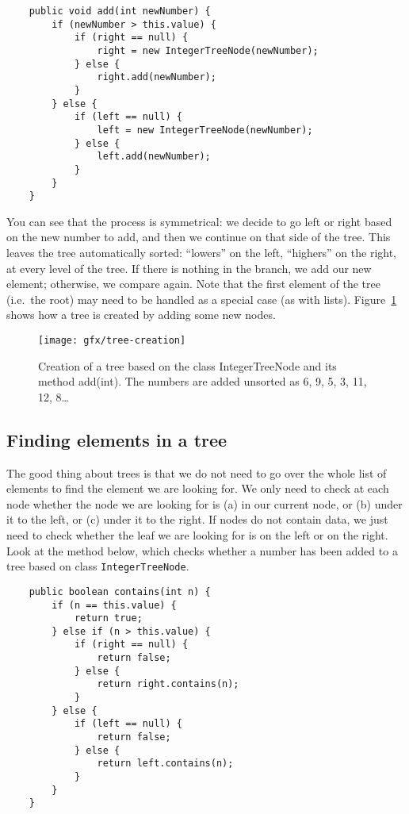 \begin{verbatim}
    public void add(int newNumber) {
        if (newNumber > this.value) {
            if (right == null) {
                right = new IntegerTreeNode(newNumber);
            } else {
                right.add(newNumber);
            }
        } else {
            if (left == null) {
                left = new IntegerTreeNode(newNumber);
            } else {
                left.add(newNumber);
            }
        }            
    }
\end{verbatim}

You can see that the process is symmetrical: we decide to go left or
right based on the new number to add, and then we continue on that
side of the tree. This leaves the tree automatically sorted: ``lowers''
on the left, ``highers'' on the right, at every level of the tree. If
there is nothing in the branch, we add our new element; otherwise, we
compare again. 
Note that the first element of the tree (i.e.~the
root) may need to be handled as a special case (as with
lists). Figure~\ref{fig:treecr} shows how a tree is created by adding
some new nodes. 

\begin{figure}[hbtp]
  \centering
  \texttt{[image: gfx/tree-creation]}
  \caption{Creation of a tree based on the class IntegerTreeNode and
    its method add(int). The numbers are added unsorted as 6, 9, 5, 3,
    11, 12, 8\ldots} 
  \label{fig:treecr}
\end{figure}

\subsection{Finding elements in a tree}
\label{sec:find-elem-tree}

The good thing about trees is that we do not need to go over the whole
list of elements to find the element we are looking for. We only need
to check at each node whether the node we are looking for is (a) in our
current node, or (b) under it to the left, or (c) under it to the right. If
nodes do not contain data, we just need to check whether the leaf we
are looking for is on the left or on the right. Look at the method
below, which checks whether a number has been added to a tree based on
class \verb+IntegerTreeNode+. 

\begin{verbatim}
    public boolean contains(int n) {
        if (n == this.value) {
            return true;
        } else if (n > this.value) {
            if (right == null) {
                return false;
            } else {
                return right.contains(n);
            }
        } else {
            if (left == null) {
                return false;
            } else {
                return left.contains(n);
            }
        }
    }
\end{verbatim}

